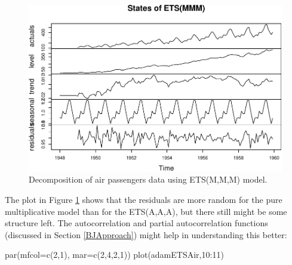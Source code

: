 \documentclass[
]{book}
\newenvironment{Shaded}{\begin{snugshade}}{\end{snugshade}}
\newcommand{\AttributeTok}[1]{\textcolor[rgb]{0.77,0.63,0.00}{#1}}
\newcommand{\DecValTok}[1]{\textcolor[rgb]{0.00,0.00,0.81}{#1}}
\newcommand{\FunctionTok}[1]{\textcolor[rgb]{0.00,0.00,0.00}{#1}}
\newcommand{\NormalTok}[1]{#1}
\newcommand{\SpecialCharTok}[1]{\textcolor[rgb]{0.00,0.00,0.00}{#1}}
\theoremstyle{definition}
\theoremstyle{definition}
\theoremstyle{definition}
\theoremstyle{definition}
\theoremstyle{remark}
\begin{document}
\begin{figure}
\centering
\includegraphics{Svetunkov--2022----ADAM_files/figure-latex/AirPassengersMMMDecomposition-1.pdf}
\caption{\label{fig:AirPassengersMMMDecomposition}Decomposition of air passengers data using ETS(M,M,M) model.}
\end{figure}

The plot in Figure \ref{fig:AirPassengersMMMDecomposition} shows that the residuals are more random for the pure multiplicative model than for the ETS(A,A,A), but there still might be some structure left. The autocorrelation and partial autocorrelation functions (discussed in Section \ref{BJApproach}) might help in understanding this better:

\begin{Shaded}
\begin{Highlighting}[]
\FunctionTok{par}\NormalTok{(}\AttributeTok{mfcol=}\FunctionTok{c}\NormalTok{(}\DecValTok{2}\NormalTok{,}\DecValTok{1}\NormalTok{), }\AttributeTok{mar=}\FunctionTok{c}\NormalTok{(}\DecValTok{2}\NormalTok{,}\DecValTok{4}\NormalTok{,}\DecValTok{2}\NormalTok{,}\DecValTok{1}\NormalTok{))}
\FunctionTok{plot}\NormalTok{(adamETSAir,}\DecValTok{10}\SpecialCharTok{:}\DecValTok{11}\NormalTok{)}
\end{Highlighting}
\end{Shaded}
\end{document}
